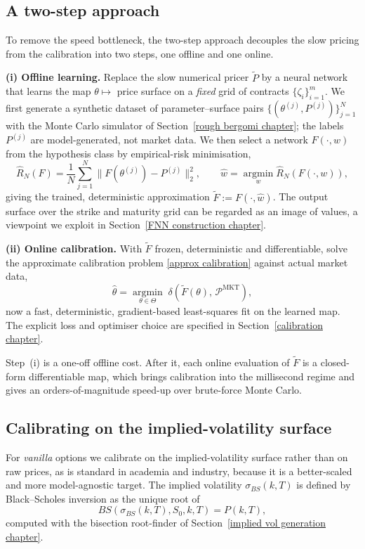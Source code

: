 \documentclass[12pt,a4paper]{article}
\theoremstyle{remark} \newtheorem{remark}[theorem]{Remark}
\begin{document}
\subsection{A two-step approach}\label{two step section}
To remove the speed bottleneck, the two-step approach decouples the slow pricing from the calibration into two steps, one offline and one online.

\textbf{(i) Offline learning.} Replace the slow numerical pricer $\widetilde P$ by a neural network that learns the map $\theta\mapsto$ price surface on a \emph{fixed} grid of contracts $\{\zeta_i\}_{i=1}^m$. We first generate a synthetic dataset of parameter--surface pairs $\{(\theta^{(j)},P^{(j)})\}_{j=1}^N$ with the Monte Carlo simulator of Section~\ref{rough bergomi chapter}; the labels $P^{(j)}$ are model-generated, not market data. We then select a network $F(\cdot,w)$ from the hypothesis class by empirical-risk minimisation,
\[
\widehat R_N(F)=\frac1N\sum_{j=1}^N\big\lVert F(\theta^{(j)})-P^{(j)}\big\rVert_2^2,\qquad
\widehat w=\operatorname*{argmin}_{w}\widehat R_N\!\left(F(\cdot,w)\right),
\]
giving the trained, deterministic approximation $\widetilde F:=F(\cdot,\widehat w)$. The output surface over the strike and maturity grid can be regarded as an image of values, a viewpoint we exploit in Section~\ref{FNN construction chapter}.

\textbf{(ii) Online calibration.} With $\widetilde F$ frozen, deterministic and differentiable, solve the approximate calibration problem \eqref{approx calibration} against actual market data,
\[
\hat\theta=\operatorname*{argmin}_{\theta\in\Theta}\;\delta\!\left(\widetilde F(\theta),\,\mathcal P^{\mathrm{MKT}}\right),
\]
now a fast, deterministic, gradient-based least-squares fit on the learned map. The explicit loss and optimiser choice are specified in Section~\ref{calibration chapter}.

Step~(i) is a one-off offline cost. After it, each online evaluation of $\widetilde F$ is a closed-form differentiable map, which brings calibration into the millisecond regime and gives an orders-of-magnitude speed-up over brute-force Monte Carlo.

\subsection{Calibrating on the implied-volatility surface}\label{iv surface section}
For \emph{vanilla} options we calibrate on the implied-volatility surface rather than on raw prices, as is standard in academia and industry, because it is a better-scaled and more model-agnostic target. The implied volatility $\sigma_{BS}(k,T)$ is defined by Black--Scholes inversion as the unique root of
\[
BS\!\left(\sigma_{BS}(k,T),S_0,k,T\right)=P(k,T),
\]
computed with the bisection root-finder of Section~\ref{implied vol generation chapter}.
\end{document}
